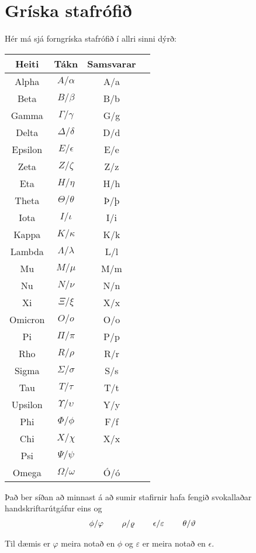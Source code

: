 \chapter*{Gríska stafrófið}

Hér má sjá forngríska stafrófið í allri sinni dýrð:

\begin{center}
	\begin{tabular}{| c | c | c |c|}
		\hline
	Heiti & Tákn & Samsvarar \\ 
	\hline \hline
	Alpha & $A/\alpha$ & A/a \\
	Beta & $B/\beta$ & B/b \\
	Gamma & $\Gamma/\gamma$ & G/g \\
	Delta & $\Delta/\delta$ & D/d \\
	Epsilon & $E/\epsilon$ & E/e \\
	Zeta & $Z/\zeta$ & Z/z \\
	Eta & $H/\eta$ & H/h \\
    Theta & $\Theta/\theta$ & Þ/þ \\
    Iota & $I/\iota$ & I/i \\
    Kappa & $K/\kappa$ & K/k \\
    Lambda & $\Lambda/\lambda$ & L/l \\
    Mu & $M/\mu$ & M/m  \\
    Nu & $N/\nu$ & N/n  \\
    Xi & $\Xi/\xi$ & X/x  \\
    Omicron & $O/o$ & O/o \\
    Pi & $\Pi/\pi$ & P/p \\
    Rho & $R/\rho$ & R/r \\
    Sigma & $\Sigma / \sigma$ & S/s \\
    Tau & $T/\tau$ & T/t \\
    Upsilon & $\Upsilon /  \upsilon$ & Y/y \\
    Phi & $\Phi /  \phi$ & F/f \\
    Chi & $X /  \chi$ & X/x \\
    Psi & $\Psi /  \psi$ &  \\
    Omega & $\Omega /  \omega$ & Ó/ó \\
	\hline
\end{tabular}
\end{center}

Það ber síðan að minnast á að sumir stafirnir hafa fengið svokallaðar handskriftarútgáfur eins og
\begin{align*}
    \phi/\varphi \hspace{0.8cm} \rho/\varrho \hspace{0.8cm}
    \epsilon/\varepsilon \hspace{0.8cm} 
    \theta/\vartheta \hspace{0.8cm} 
\end{align*}

 Til dæmis er $\varphi$ meira notað en $\phi$ og $\varepsilon$ er meira notað en $\epsilon$.


\newpage
